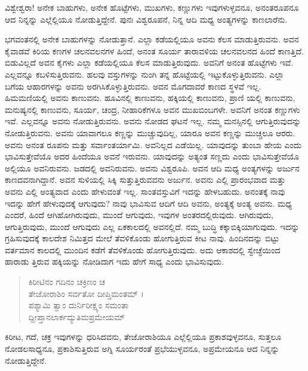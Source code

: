 {\small ವಿಶ್ವೇಶ್ವರಾ! ಅನೇಕ ಬಾಹುಗಳು, ಅನೇಕ ಹೊಟ್ಟೆಗಳು, ಮುಖಗಳು, ಕಣ್ಣುಗಳು ಇವುಗಳುಳ್ಳವನೂ, ಅನಂತರೂಪನೂ ಆದ ನಿನ್ನನ್ನು ಎಲ್ಲೆಲ್ಲಿಯೂ ನೋಡುತ್ತಿದ್ದೇನೆ. ಪುನಃ ವಿಶ್ವರೂಪನೆ, ನಿನ್ನ ಆದಿ ಮಧ್ಯ ಅಂತ್ಯಗಳನ್ನು ಕಾಣಲಾರೆನು.}

ಭಗವಂತನಲ್ಲಿ ಅನೇಕ ಬಾಹುಗಳನ್ನು ನೋಡುತ್ತಾನೆ. ಎಲ್ಲಾ ಕಡೆಯಲ್ಲಿಯೂ ಅವನು ಕೆಲಸ ಮಾಡುತ್ತಿರುವನು. ಅವನ ಕೈವಾಡವೆ ಕಿರಿಯ ಕಣಗಳ ಚಲನವಲನಗಳ ಹಿಂದೆ, ಅನಂತ ಸೂರ್ಯ ತಾರಾವಳಿಯ ಚಲನವಲನದ ಹಿಂದೆ ಕಾಣತ್ತಿದೆ. ಬಿಡುವಿಲ್ಲದೆ ಅವನ ಕೈಗಳು ಎಲ್ಲಾ ಕಡೆಯಲ್ಲಿಯೂ ಕೆಲಸ ಮಾಡುತ್ತಿರುವುದು. ಅವನಿಗೆ ಅನಂತ ಹೊಟ್ಟೆಗಳು ಇವೆ. ಎಲ್ಲವನ್ನೂ ಕಬಳಿಸುತ್ತಿರುವನು. ಹಲವು ವಸ್ತುಗಳನ್ನು ನುಂಗಿ ತನ್ನ ಹೊಟ್ಟೆಯಲ್ಲಿ ಇಟ್ಟುಕೊಳ್ಳುತ್ತಿರುವನು. ಎಲ್ಲಾ ಬಗೆಯ ಆಹಾರಗಳನ್ನು ಅವನು ಅರಗಿಸಿಕೊಳ್ಳುತ್ತಿರುವನು. ಅವನ ಮೊಗದಾವರೆ ಕಾಣದ ಸ್ಥಳವೆ ಇಲ್ಲ. ಹಿಮಮಣಿಯಲ್ಲಿ ಅವನು ಕಾಣುವನು. ಹೂವಿನಲ್ಲಿ ಕಾಣುವನು, ಹಕ್ಕಿಯಲ್ಲಿ ಕಾಣುವನು, ಪ್ರಾಣಿ ಯಲ್ಲಿ ಕಾಣುವನು, ಮನುಷ್ಯನಲ್ಲಿ ಕಾಣುವನು, ಸೂರ್ಯ, ಚಂದ್ರ, ನೀಹಾರಿಕೆಗಳೂ ಅವನ ಮುಖಬಿಂಬಗಳೇ. ಅವನಿಗೆ ಅನಂತ ಕಣ್ಣುಗಳು ಇವೆ. ಎಲ್ಲವನ್ನೂ ಅವನು ನೋಡುತ್ತಿರುವನು. ಅವನು ನೋಡದ ಘಟನೆ ಇಲ್ಲ. ನಮ್ಮ ಮನಸ್ಸಿನಲ್ಲಿ ಆಗುತ್ತಿರುವುದನ್ನು ನೋಡುತ್ತಿರುವನು. ಅವನು ಯಾವಾಗಲೂ ಕಣ್ಣನ್ನು ಮುಚ್ಚುವುದಿಲ್ಲ, ಯಾರೂ ಅವನ ಕಣ್ಣನ್ನು ಮುಚ್ಚಲೂ ಆರರು. ಅವನು ಅನಂತ ರೂಪನು ಮತ್ತು ಸರ್ವಾಂತರ್ಯಾಮಿ. ಅವನಿಲ್ಲದ ಎಡೆಯಿಲ್ಲ. ಯಾವುದನ್ನು ತುಂಬಾ ಹೇಯ ಎಂದು ಭಾವಿಸುತ್ತೇವೆಯೊ ಅದರ ಹಿಂದೆಯೂ ಅವನೆ ಇರುವನು. ಯಾವುದನ್ನು ಅತ್ಯಂತ ಸಣ್ಣದು ಎಂದು ಭಾವಿಸುತ್ತೇವೆಯೊ ಅಲ್ಲಿಯೂ ಅವನಿರುವನು. ಜಡದಲ್ಲಿ ಅವನಿರುವನು. ಅವನು ವಿಶ್ವರೂಪಿ. ಅವನ ಆದಿ ಮಧ್ಯ ಅಂತ್ಯಗಳನ್ನು ಅರ್ಜುನ ಕಾಣದವನಾಗಿದ್ದಾನೆ. ಅವನ ಸುಳಿಯಲ್ಲಿ ಸಿಕ್ಕಿ ಸುತ್ತುತ್ತಿರುವವನು ಅರ್ಜುನ. ಅವನು ಎಲ್ಲಿ ಪ್ರಾರಂಭವಾದ ಮತ್ತು ಅವನು ಎಲ್ಲಿ ಅಂತ್ಯವಾದ ಎಂದು ಹೇಳುವಂತೆ ಇಲ್ಲ. ಸಾಂತವಸ್ತುವಿಗೆ ಇದನ್ನು ಹೇಳಬಹುದು. ಅನಂತಕ್ಕೆ ನಾವು ಇದನ್ನು ಹೇಗೆ ಹೇಳುವುದಕ್ಕೆ ಆಗುವುದು? ನಾವು ಭಾವಿಸುವ ಆದಿಗೆ ಆದಿ ಅವನು, ಅಂತ್ಯಕ್ಕೆ ಅಂತ್ಯ ಅವನು. ಮಧ್ಯ ಎಂದರೆ, ಹಿಂದೆ ಆಗಿಹೋಗಿರುವುದು, ಮುಂದೆ ಆಗುವುದು, ಇವುಗಳ ಅಂತರದಲ್ಲಿರುವುದು. ಆಗಿರುವುದು, ಆಗುತ್ತಿರುವುದು, ಮುಂದೆ ಆಗುವುದು ಎಲ್ಲ ಏಕಕಾಲದಲ್ಲಿ ಅವನಲ್ಲಿದೆ. ನಮ್ಮ ಬುದ್ಧಿ ಕಕ್ಕಾಬಿಕ್ಕಿಯಾಗುವುದು. ಇದನ್ನು ಗ್ರಹಿಸುವುದಕ್ಕೆ ಕಾಲದೇಶ ನಿಮಿತ್ತದ ಮೇಲೆ ತೆವಳಿಕೊಂಡು ಹೋಗುತ್ತಿರುವ ಕೀಟ ನಾವು. ಹಿಂದಿನದನ್ನು ಬಿಟ್ಟು ವರ್ತಮಾನ ಕಾಲದಲ್ಲಿ ಮುಂದಿನ ಕಡೆಗೆ ತೆವಳಿಕೊಂಡು ಹೋಗುತ್ತಿರುವುದು. ಅದು ಆಕಾಶದಲ್ಲಿ ಸ್ವೇಚ್ಛೆಯಿಂದ ಹಾರಾಡು ತ್ತಿರುವ ಹಕ್ಕಿಯನ್ನು ನೋಡಿದಾಗ ಇದು ಹೇಗೆ ಸಾಧ್ಯ ಎಂದು ಭಾವಿಸುವುದು.

\begin{verse}
ಕಿರೀಟಿನಂ ಗದಿನಂ ಚಕ್ರಿಣಂ ಚ\\ ತೇಜೋರಾಶಿಂ ಸರ್ವತೋ ದೀಪ್ತಿಮಂತಮ್ ।\\ಪಶ್ಯಾಮಿ ತ್ವಾಂ ದುರ್ನಿರೀಕ್ಷ್ಯಂ ಸಮಂತಾ\\ ದ್ದೀಪ್ತಾನಲಾರ್ಕದ್ಯುತಿಮಪ್ರಮೇಯಮ್ 
\end{verse}

{\small ಕಿರೀಟ, ಗದೆ, ಚಕ್ರ ಇವುಗಳನ್ನು ಧರಿಸಿದವನು, ತೇಜೋರಾಶಿಯೂ ಎಲ್ಲೆಲ್ಲಿಯೂ ಪ್ರಕಾಶವುಳ್ಳವನೂ, ಸುತ್ತಲೂ ನೋಡಲಸಾಧ್ಯನೂ, ಪ್ರಕಾಶಿಸುತ್ತಿರುವ ಅಗ್ನಿ ಸೂರ್ಯರಂತೆ ಪ್ರಭೆಯುಳ್ಳವನೂ, ಅಪ್ರಮೇಯನೂ ಆದ ನಿನ್ನನ್ನು ನೋಡುತ್ತಿದ್ದೇನೆ.}

